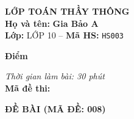 \noindent
\begin{tcolorbox}[colback=white,colframe=black,arc=0mm,boxrule=0.8pt,top=4pt,bottom=4pt,left=6pt,right=6pt]
	\begin{minipage}[c]{0.44\textwidth}
		{\bfseries\large LỚP TOÁN THẦY THÔNG}\\[3pt]
		\textbf{Họ và tên:} \textbf{\large Gia Bảo A}\\[3pt]
		\textbf{Lớp:} LỚP 10 \quad -- \quad \textbf{Mã HS:} \texttt{HS003}
	\end{minipage}
	\hfill
	\begin{minipage}[c]{0.22\textwidth}
		\begin{tcolorbox}[colback=white,colframe=black,arc=0mm,boxrule=0.6pt,height=1.8cm,halign=center,valign=top,top=2pt]
			{\bfseries\normalsize Điểm}
		\end{tcolorbox}
	\end{minipage}
	\hfill
	\begin{minipage}[c]{0.30\textwidth}
		\raggedleft
		\textit{Thời gian làm bài: 30 phút}\\[4pt]
		\textbf{Mã đề thi:} 
	\end{minipage}
\end{tcolorbox}
\vspace{0.25cm}

\noindent\textbf{\large ĐỀ BÀI (MÃ ĐỀ: 008)}
\vspace{0.1cm}

